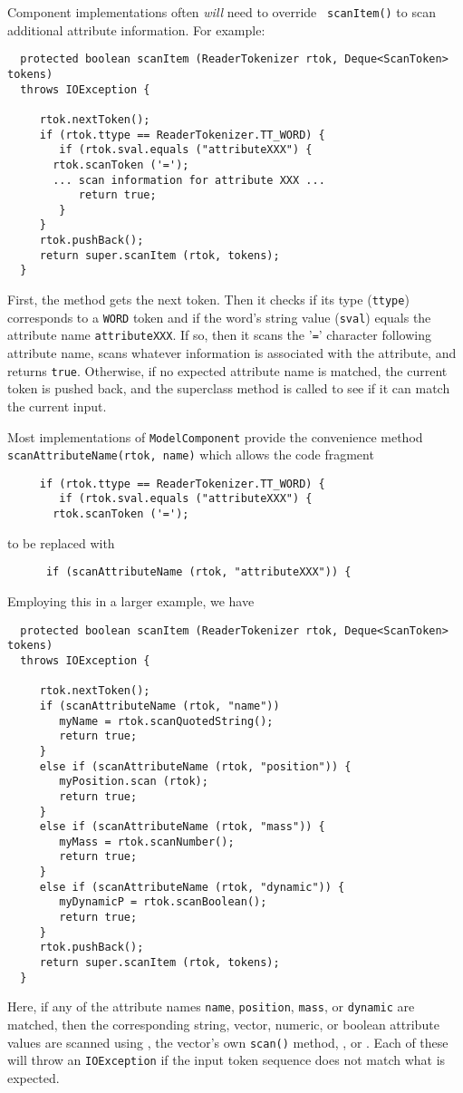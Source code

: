 \documentclass{article}
\begin{document}
Component implementations often {\it will} need to override {\tt
scanItem()} to scan additional attribute information. For example:
\begin{lstlisting}
  protected boolean scanItem (ReaderTokenizer rtok, Deque<ScanToken> tokens)
  throws IOException {

     rtok.nextToken();
     if (rtok.ttype == ReaderTokenizer.TT_WORD) {
        if (rtok.sval.equals ("attributeXXX") {
	   rtok.scanToken ('=');
	   ... scan information for attribute XXX ...
           return true;
        }
     }
     rtok.pushBack();
     return super.scanItem (rtok, tokens);
  }	
\end{lstlisting}
First, the method gets the next token. Then it checks if its type
({\tt ttype}) corresponds to a {\tt WORD} token and if the word's string
value ({\tt sval}) equals the attribute name {\tt attributeXXX}.  If
so, then it scans the '{\tt =}' character following attribute name,
scans whatever information is associated with the attribute, and
returns {\tt true}.  Otherwise, if no expected attribute name is
matched, the current token is pushed back, and the superclass method
is called to see if it can match the current input.

Most implementations of {\tt ModelComponent}
provide the convenience method {\tt scanAttributeName(rtok, name)}
which allows the code fragment 
\begin{lstlisting}
     if (rtok.ttype == ReaderTokenizer.TT_WORD) {        
        if (rtok.sval.equals ("attributeXXX") {
	   rtok.scanToken ('=');
\end{lstlisting}
to be replaced with
\begin{lstlisting}
      if (scanAttributeName (rtok, "attributeXXX")) {
\end{lstlisting}
Employing this in a larger example, we have
\begin{lstlisting}
  protected boolean scanItem (ReaderTokenizer rtok, Deque<ScanToken> tokens)
  throws IOException {

     rtok.nextToken();
     if (scanAttributeName (rtok, "name")) 
        myName = rtok.scanQuotedString();
        return true;
     }
     else if (scanAttributeName (rtok, "position")) {
        myPosition.scan (rtok);
        return true;
     }
     else if (scanAttributeName (rtok, "mass")) {
        myMass = rtok.scanNumber();
        return true;
     }
     else if (scanAttributeName (rtok, "dynamic")) {
        myDynamicP = rtok.scanBoolean();
        return true;
     }
     rtok.pushBack();
     return super.scanItem (rtok, tokens);
  }	
\end{lstlisting}
Here, if any of the attribute names 
{\tt name}, {\tt position}, {\tt mass}, or {\tt dynamic} are matched,
then the 
corresponding string, vector, numeric, or boolean attribute values are
scanned using
, the
vector's own {\tt scan()} method,
, or
.  Each of
these will throw an {\tt IOException} if the input token sequence does
not match what is expected.
\end{document}
